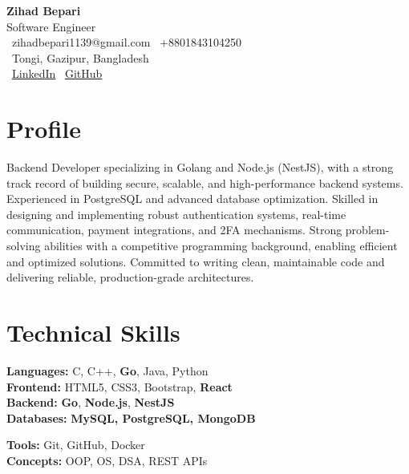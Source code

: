 \documentclass[11pt,a4paper]{article}
\begin{document}
\begin{center}
  {\Huge \textbf{Zihad Bepari}}\\
  {\Large Software Engineer}\\[6pt]
  {\small
    \faEnvelope\ zihadbepari1139@gmail.com \quad
    \faPhone\ +8801843104250 \\[4pt]
    \faMapMarker\ Tongi, Gazipur, Bangladesh \\[4pt]
    \faLinkedin\ \href{https://www.linkedin.com/in/zihad-bepari-313411329/}{LinkedIn} \quad
    \faGithub\ \href{https://github.com/Zihad-Bepari}{GitHub}
  }
\end{center}

\vspace{6pt}

\section*{Profile}
{\small
Backend Developer specializing in Golang and Node.js (NestJS), with a strong track record of building secure, scalable, and high-performance backend systems. Experienced in PostgreSQL and advanced database optimization. Skilled in designing and implementing robust authentication systems, real-time communication, payment integrations, and 2FA mechanisms. Strong problem-solving abilities with a competitive programming background, enabling efficient and optimized solutions. Committed to writing clean, maintainable code and delivering reliable, production-grade architectures.
}

\section*{Technical Skills}

\noindent
\begin{minipage}[t]{0.48\textwidth}
\textbf{Languages:} C, C++, \textbf{Go}, Java, Python \\ 
\textbf{Frontend:} HTML5, CSS3, Bootstrap, \textbf{React} \\
\textbf{Backend:} \textbf{Go}, \textbf{Node.js}, \textbf{NestJS} \\ 
\textbf{Databases:} \textbf{MySQL, PostgreSQL, MongoDB} \\
\end{minipage}
\hfill
\begin{minipage}[t]{0.48\textwidth}
\textbf{Tools:} Git, GitHub, Docker \\
\textbf{Concepts:} OOP, OS, DSA, REST APIs
\end{minipage}
\end{document}
